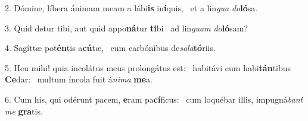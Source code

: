2. Dómine, líbera ánimam meam a lábi\textbf{is} in\textbf{í}quis, \ast\  et a lin\textit{gua} \textit{do}\textbf{ló}sa.\

3. Quid detur tibi, aut quid appo\textbf{ná}tur \textbf{ti}bi \ast\  ad lin\textit{guam} \textit{do}\textbf{ló}sam?\

4. Sagíttæ pot\textbf{én}tis a\textbf{cú}tæ, \ast\  cum carbónibus de\textit{so}\textit{la}\textbf{tó}riis.\

5. Heu mihi! quia incolátus meus prolongátus est: \dag\  habitávi cum habi\textbf{tán}tibus \textbf{Ce}dar: \ast\  multum íncola fuit á\textit{ni}\textit{ma} \textbf{me}a.\

6. Cum his, qui odérunt pacem, \textbf{e}ram pa\textbf{cí}ficus: \ast\  cum loquébar illis, impugná\textit{bant} \textit{me} \textbf{gra}tis.\

